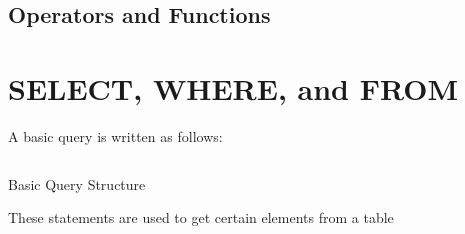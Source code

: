 \documentclass[12pt, letterpaper]{report}
\newcommand{\codein}[2]{\inputminted[fontsize=\large, breaklines, tabsize=4, breakanywhere]{#1}{#2}}
\newcommand{\listcodesc}[3]{
\begin{code}[H]
	\centering
	\codein{#1}{#2}
	\caption{#3}
\end{code}
}
\begin{document}
\subsection{Operators and Functions}



\section{SELECT, WHERE, and FROM}

A basic query is written as follows:

\listcodesc{sql}{Example_001.sql}{Basic Query Structure}

These statements are used to get certain elements from a table
\end{document}
